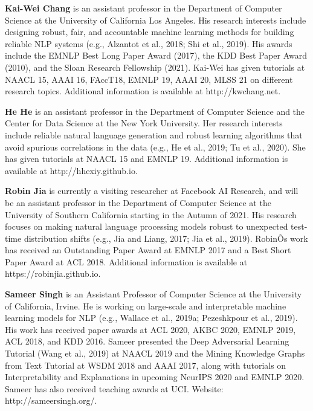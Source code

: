 \begin{bio}
  {\bfseries Kai-Wei Chang} is an assistant professor in the Department of Computer Science at the University of California Los Angeles. His research interests include designing robust, fair, and accountable machine learning methods for building reliable NLP systems (e.g., Alzantot et al., 2018; Shi et al., 2019). His awards include the EMNLP Best Long Paper Award (2017), the KDD Best Paper Award (2010), and the Sloan Research Fellowship (2021). Kai-Wei has given tutorials at NAACL 15, AAAI 16, FAccT18, EMNLP 19, AAAI 20, MLSS 21 on different research topics. Additional information is available at http://kwchang.net.

  {\bfseries He He} is an assistant professor in the Department of Computer Science and the Center for Data Science at the New York University. Her research interests include reliable natural language generation and robust learning algorithms that avoid spurious correlations in the data (e.g., He et al., 2019; Tu et al., 2020). She has given tutorials at NAACL 15 and EMNLP 19. Additional information is available at http://hhexiy.github.io.

  {\bfseries Robin Jia} is currently a visiting researcher at Facebook AI Research, and will be an assistant professor in the Department of Computer Science at the University of Southern California starting in the Autumn of 2021. His research focuses on making natural language processing models robust to unexpected test-time distribution shifts (e.g., Jia and Liang, 2017; Jia et al., 2019). RobinÕs work has received an Outstanding Paper Award at EMNLP 2017 and a Best Short Paper Award at ACL 2018. Additional information is available at https://robinjia.github.io.

  {\bfseries Sameer Singh} is an Assistant Professor of Computer Science at the University of California, Irvine. He is working on large-scale and interpretable machine learning models for NLP (e.g., Wallace et al., 2019a; Pezeshkpour et al., 2019). His work has received paper awards at ACL 2020, AKBC 2020, EMNLP 2019, ACL 2018, and KDD 2016. Sameer presented the Deep Adversarial Learning Tutorial (Wang et al., 2019) at NAACL 2019 and the Mining Knowledge Graphs from Text Tutorial at WSDM 2018 and AAAI 2017, along with tutorials on Interpretability and Explanations in upcoming NeurIPS 2020 and EMNLP 2020. Sameer has also received teaching awards at UCI. Website: http://sameersingh.org/.

\end{bio}

